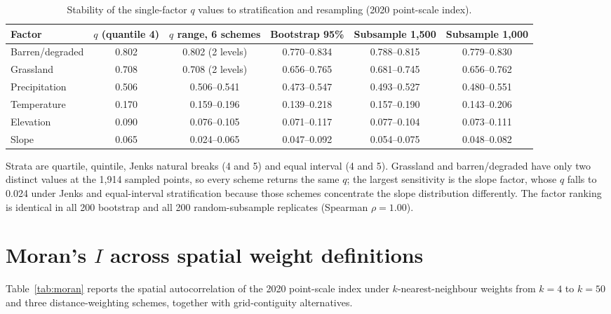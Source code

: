 \documentclass[preprint,11pt,authoryear]{elsarticle}
\begin{document}
\begin{table}[htbp]
\centering
\caption{Stability of the single-factor $q$ values to stratification and resampling (2020 point-scale index).}
\label{tab:strat}
\footnotesize
\setlength{\tabcolsep}{2.5pt}
\begin{tabular}{lccccc}
\toprule
Factor & $q$ (quantile 4) & $q$ range, 6 schemes & Bootstrap 95\% & Subsample 1{,}500 & Subsample 1{,}000 \\
\midrule
Barren/degraded & 0.802 & 0.802 (2 levels) & 0.770--0.834 & 0.788--0.815 & 0.779--0.830 \\
Grassland & 0.708 & 0.708 (2 levels) & 0.656--0.765 & 0.681--0.745 & 0.656--0.762 \\
Precipitation & 0.506 & 0.506--0.541 & 0.473--0.547 & 0.493--0.527 & 0.480--0.551 \\
Temperature & 0.170 & 0.159--0.196 & 0.139--0.218 & 0.157--0.190 & 0.143--0.206 \\
Elevation & 0.090 & 0.076--0.105 & 0.071--0.117 & 0.077--0.104 & 0.073--0.111 \\
Slope & 0.065 & 0.024--0.065 & 0.047--0.092 & 0.054--0.075 & 0.048--0.082 \\
\bottomrule
\end{tabular}

\vspace{2pt}
{\scriptsize Strata are quartile, quintile, Jenks natural breaks (4 and 5) and equal interval (4 and 5). Grassland and barren/degraded have only two distinct values at the 1{,}914 sampled points, so every scheme returns the same $q$; the largest sensitivity is the slope factor, whose $q$ falls to 0.024 under Jenks and equal-interval stratification because those schemes concentrate the slope distribution differently. The factor ranking is identical in all 200 bootstrap and all 200 random-subsample replicates (Spearman $\rho=1.00$).}
\end{table}

\section{Moran's $I$ across spatial weight definitions}
\label{app:moran}
Table~\ref{tab:moran} reports the spatial autocorrelation of the 2020 point-scale index under $k$-nearest-neighbour weights from $k=4$ to $k=50$ and three distance-weighting schemes, together with grid-contiguity alternatives.
\end{document}
